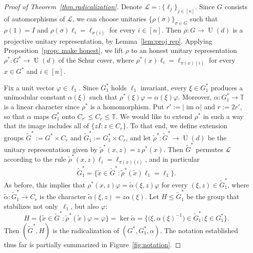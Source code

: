 \documentclass[11pt]{article}
\theoremstyle{definition}
\numberwithin{equation}{section}
\begin{document}
\begin{proof}[Proof of Theorem~\ref{thm.radicalization}]
Denote $\mathscr{L} =: \{ \ell_j \}_{j \in [n]}$.
Since $G$ consists of automorphisms of $\mathscr{L}$, we can choose unitaries $\{ \rho(\sigma) \}_{\sigma \in G}$ such that $\rho(1) = I$ and $\rho(\sigma) \ell_i = \ell_{\sigma(i)}$ for every $i \in [n]$.
Then $\rho \colon G \to \operatorname{U}(d)$ is a projective unitary representation, by Lemma~\ref{lem:proj rep}.
Applying Proposition~\ref{prop: make honest}, we lift $\rho$ to an honest unitary representation $\rho^* \colon G^* \to \operatorname{U}(d)$ of the Schur cover, where $\rho^*(x) \ell_i = \ell_{\pi(x)(i)}$ for every $x \in G^*$ and $i \in [n]$.

Fix a unit vector $\varphi \in \ell_1$.
Since $G_1^*$ holds $\ell_1$ invariant, every $\xi \in G_1^*$ produces a unimodular constant $\alpha(\xi)$ such that $\rho^*(\xi) \varphi = \alpha(\xi) \varphi$.
Moreover, $\alpha \colon G_1^* \to \mathbb{T}$ is a linear character since $\rho^*$ is a homomorphism.
Put $r' := |\operatorname{im} \alpha|$ and $r := 2r'$, so that $\alpha$ maps $G_1^*$ onto $C_{r'} \leq C_r \leq \mathbb{T}$.
We would like to extend $\rho^*$ in such a way that its image includes all of $\{z I : z \in C_r\}$.
To that end, we define extension groups $\widetilde{G}^* := G^* \times C_r$ and $\widetilde{G}_1^* := G_1^* \times C_r$, and let $\tilde{\rho}^* \colon \widetilde{G}^* \to \operatorname{U}(d)$ be the unitary representation given by $\tilde{\rho}^*(x,z) = z\, \rho^*(x)$.
Then $\widetilde{G}^*$ permutes $\mathscr{L}$ according to the rule $\tilde{\rho}^*(x,z) \ell_i = \ell_{\pi(x)(i)}$, and in particular
\begin{equation}
\label{eq: line stabilizer}
\widetilde{G}_1^* = \bigl\{ \tilde{x} \in \widetilde{G}^* : \tilde{\rho}^*(\tilde{x}) \ell_1 = \ell_1 \bigr\}.
\end{equation}
As before, this implies that $\rho^*(x,z) \varphi = \widetilde{\alpha}(\xi,z) \varphi$ for every $(\xi,z) \in \widetilde{G}_1^*$, where $\widetilde{\alpha} \colon \widetilde{G}_1^* \to C_r$ is the character $\widetilde{\alpha}(\xi,z) = z \alpha(\xi)$.
Let $H \leq \widetilde{G}_1^*$ be the group that stabilizes not only~$\ell_1$, but also $\varphi$:
\[ H = \bigl\{ \tilde{x} \in \widetilde{G}^* : \tilde{\rho}^*(\tilde{x}) \varphi = \varphi \bigr\} = \ker \widetilde{\alpha} = \bigl\{ \bigl(\xi,\alpha(\xi)^{-1}\bigr) \in \widetilde{G}_1^* : \xi \in G_1^* \bigr\}. \]
Then $(\widetilde{G}^*, H)$ is the radicalization of $(G^*,G^*_1,\alpha)$.
The notation established thus far is partially summarized in Figure~\ref{fig:notation}.


\end{proof}
\end{document}
